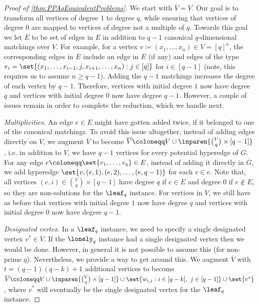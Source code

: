 \begin{proof}[Proof of \autoref{thm:PPAqEquivalentProblems}]
We start with $\overline{V} = V$. Our goal is to transform all vertices of degree $1$ to degree $q$, while ensuring that vertices of degree $0$ are mapped to vertices of degree not a multiple of $q$. Towards this goal we let $\overline{E}$ to be set of edges in $E$ in addition to $q-1$ canonical $q$-dimensional matchings over $V$. For example, for a vertex $v \coloneqq (x_1, \ldots, x_n) \in V = [q]^n$, the corresponding edges in $\overline{E}$ include an edge in $E$ (if any) and edges of the type $e_i = \set{(x_1, \dots, x_{i-1}, j, x_{i+1}, \dots, x_n) : j \in [q]}$ for $i \in [q-1]$ (note, this requires us to assume $n \geq q-1$). Adding the $q-1$ matchings increases the degree of each vertex by $q-1$. Therefore, vertices with initial degree $1$ now have degree $q$ and vertices with initial degree $0$ now have degree $q-1$. However, a couple of issues remain in order to complete the reduction, which we handle next.

{\em Multiplicities.} An edge $e \in E$ might have gotten added twice, if it belonged to one of the canonical matchings. To avoid this issue altogether, instead of adding edges directly on $V$, we augment $\overline{V}$ to become $\overline{V} \coloneqq V \cup \inparen{\binom{V}{q} \times [q-1]}$, i.e. in addition to $V$, we have $q-1$ vertices for every potential hyperedge of $G$. For any edge $e\coloneqq\set{v_1, \ldots, v_q} \in E$, instead of adding it directly in $\overline{G}$, we add hyperedge $\set{v, (e,1), (e,2), \ldots, (e,q-1)}$ for each $v \in e$. Note that, all vertices $(e,i) \in \binom{V}{q} \times [q-1]$ have degree $q$ if $e \in E$ and degree $0$ if $e \notin E$, so they are non-solutions for the $\leaf_q$ instance. For vertices in $V$, we still have as before that vertices with initial degree $1$ now have degree $q$ and vertices with initial degree $0$ now have degree $q-1$.

{\em Designated vertex.} In a $\leaf_q$ instance, we need to specify a single designated vertex $v^* \in \overline{V}$. If the $\lonely_q$ instance had a single designated vertex then we would be done. However, in general it is not possible to assume this (for non-prime $q$). Nevertheless, we provide a way to get around this. We augment $\overline{V}$ with $t = (q-1)(q-k) + 1$ additional vertices to become $\overline{V} \coloneqq V \cup  \inparen{\binom{V}{q} \times [q-1]} \cup \set{w_{i,j} : i \in [q-k],\ j \in [q-1]} \cup \set{v^*}$, where $v^*$ will eventually be the single designated vertex for the $\leaf_q$ instance.


\end{proof}
